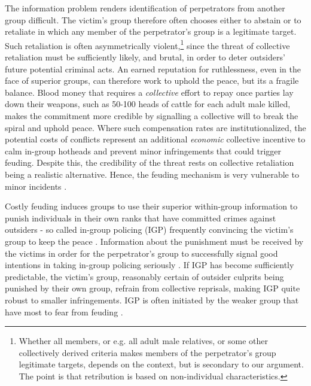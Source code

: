 The information problem renders identification of perpetrators from another
group difficult. The victim's group therefore often chooses either to abstain or
to retaliate in which any member of the perpetrator's group is a legitimate
target. Such retaliation is often asymmetrically violent,\footnote{ Whether all
	members, or e.g. all adult male relatives, or some other collectively
	derived criteria makes members of the perpetrator’s group legitimate
	targets, depends on the context, but is secondary to our argument. The
point is that retribution is based on non-individual characteristics.} since the
threat of collective retaliation must be sufficiently likely, and brutal, in
order to deter outsiders' future potential criminal acts. An earned reputation
for ruthlessness, even in the face of superior groups, can therefore work to
uphold the peace, but its a fragile balance. Blood money that requires a
\textit{collective} effort to repay once parties lay down their weapons, such as
50-100 heads of cattle for each adult male killed, makes the commitment more
credible by signalling a collective will to break the spiral and uphold peace.
Where such compensation rates are institutionalized, the potential costs of
conflicts represent an additional \textit{economic} collective incentive to calm
in-group hotheads and prevent minor infringements that could trigger feuding.
Despite this, the credibility of the threat rests on collective retaliation
being a realistic alternative. Hence, the feuding mechanism is very vulnerable
to minor incidents \citep{Fearon_1996}.

Costly feuding induces groups to use their superior within-group information to
punish individuals in their own ranks that have committed crimes against
outsiders - so called in-group policing (IGP) frequently convincing the victim's
group to keep the peace \citep[723]{Fearon_1996}. Information about the
punishment must be received by the victims in order for the perpetrator's group
to successfully signal good intentions in taking in-group policing seriously
\citep{Fearon_1996}. If IGP has become sufficiently predictable, the victim’s
group, reasonably certain of outsider culprits being punished by their own
group, refrain from collective reprisals, making IGP quite robust to smaller
infringements. IGP is often initiated by the weaker group that have most to fear
from feuding \citep[50]{Lake_1996}. 

